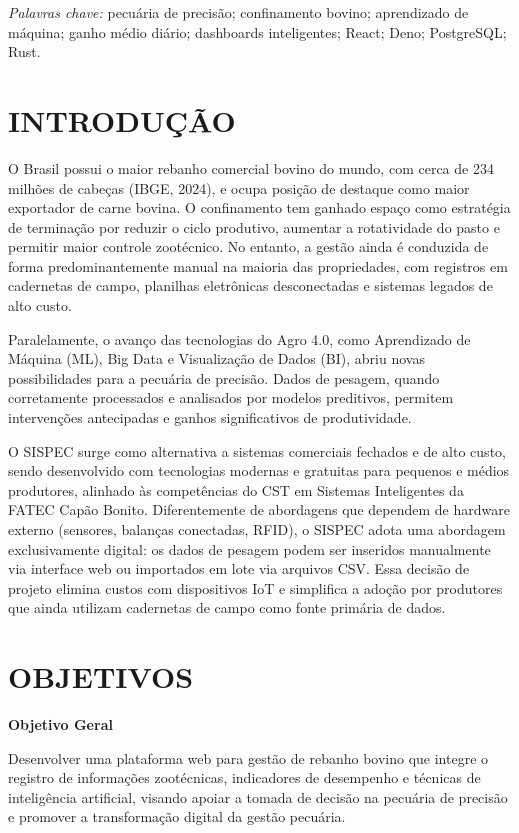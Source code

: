 \documentclass[12pt,a4paper]{article}
\begin{document}
\noindent \textit{Palavras chave:} pecu\'aria de precis\~ao; confinamento bovino; aprendizado de m\'aquina; ganho m\'edio di\'ario; dashboards inteligentes; React; Deno; PostgreSQL; Rust.

\section{INTRODU\c C\~AO}

O Brasil possui o maior rebanho comercial bovino do mundo, com cerca de 234 milh\~oes de cabe\c cas (IBGE, 2024), e ocupa posi\c c\~ao de destaque como maior exportador de carne bovina. O confinamento tem ganhado espa\c co como estrat\'egia de termina\c c\~ao por reduzir o ciclo produtivo, aumentar a rotatividade do pasto e permitir maior controle zoot\'ecnico. No entanto, a gest\~ao ainda \'e conduzida de forma predominantemente manual na maioria das propriedades, com registros em cadernetas de campo, planilhas eletr\^onicas desconectadas e sistemas legados de alto custo.

Paralelamente, o avan\c co das tecnologias do Agro 4.0, como Aprendizado de M\'aquina (ML), Big Data e Visualiza\c c\~ao de Dados (BI), abriu novas possibilidades para a pecu\'aria de precis\~ao. Dados de pesagem, quando corretamente processados e analisados por modelos preditivos, permitem interven\c c\~oes antecipadas e ganhos significativos de produtividade.

O SISPEC surge como alternativa a sistemas comerciais fechados e de alto custo, sendo desenvolvido com tecnologias modernas e gratuitas para pequenos e m\'edios produtores, alinhado \`as compet\^encias do CST em Sistemas Inteligentes da FATEC Cap\~ao Bonito. Diferentemente de abordagens que dependem de hardware externo (sensores, balan\c cas conectadas, RFID), o SISPEC adota uma abordagem exclusivamente digital: os dados de pesagem podem ser inseridos manualmente via interface web ou importados em lote via arquivos CSV. Essa decis\~ao de projeto elimina custos com dispositivos IoT e simplifica a ado\c c\~ao por produtores que ainda utilizam cadernetas de campo como fonte prim\'aria de dados.

\section{OBJETIVOS}

\textbf{Objetivo Geral}

Desenvolver uma plataforma web para gest\~ao de rebanho bovino que integre o registro de informa\c c\~oes zoot\'ecnicas, indicadores de desempenho e t\'ecnicas de intelig\^encia artificial, visando apoiar a tomada de decis\~ao na pecu\'aria de precis\~ao e promover a transforma\c c\~ao digital da gest\~ao pecu\'aria.
\end{document}
